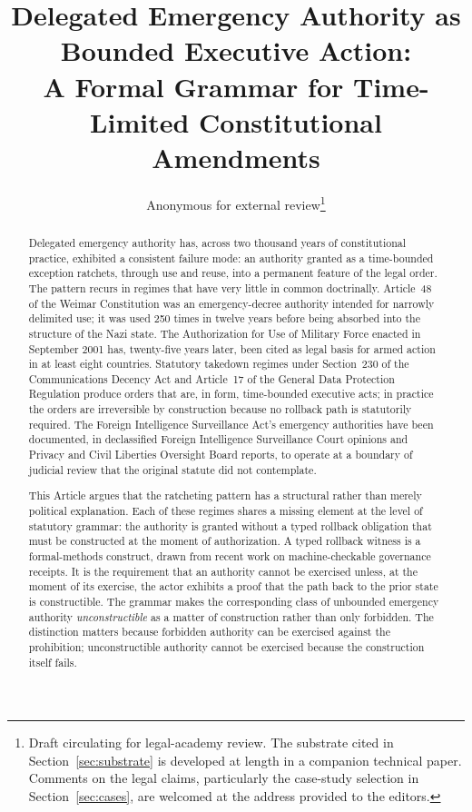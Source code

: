 \documentclass[11pt]{article}
\title{\large\bfseries Delegated Emergency Authority as Bounded Executive Action:\\
A Formal Grammar for Time-Limited Constitutional Amendments}
\author{Anonymous for external review\thanks{Draft circulating for legal-academy review.
The substrate cited in Section~\ref{sec:substrate} is developed at length in a companion technical paper.
Comments on the legal claims, particularly the case-study selection in Section~\ref{sec:cases},
are welcomed at the address provided to the editors.}}
\date{}
\begin{document}
\maketitle

\begin{abstract}
\noindent
Delegated emergency authority has, across two thousand years of constitutional practice,
exhibited a consistent failure mode: an authority granted as a time-bounded exception ratchets,
through use and reuse, into a permanent feature of the legal order.
The pattern recurs in regimes that have very little in common doctrinally.
Article~48 of the Weimar Constitution was an emergency-decree authority intended for narrowly delimited use;
it was used 250 times in twelve years before being absorbed into the structure of the Nazi state.
The Authorization for Use of Military Force enacted in September 2001 has, twenty-five years later,
been cited as legal basis for armed action in at least eight countries.
Statutory takedown regimes under Section~230 of the Communications Decency Act and Article~17 of the
General Data Protection Regulation produce orders that are, in form, time-bounded executive acts;
in practice the orders are irreversible by construction because no rollback path is statutorily required.
The Foreign Intelligence Surveillance Act's emergency authorities have been documented,
in declassified Foreign Intelligence Surveillance Court opinions and Privacy and Civil Liberties Oversight Board reports,
to operate at a boundary of judicial review that the original statute did not contemplate.

This Article argues that the ratcheting pattern has a structural rather than merely political explanation.
Each of these regimes shares a missing element at the level of statutory grammar:
the authority is granted without a typed rollback obligation that must be constructed
at the moment of authorization.
A typed rollback witness is a formal-methods construct, drawn from recent work on
machine-checkable governance receipts.
It is the requirement that an authority cannot be exercised unless,
at the moment of its exercise,
the actor exhibits a proof that the path back to the prior state is constructible.
The grammar makes the corresponding class of unbounded emergency authority \emph{unconstructible}
as a matter of construction rather than only forbidden.
The distinction matters because forbidden authority can be exercised against the prohibition;
unconstructible authority cannot be exercised because the construction itself fails.


\end{abstract}
\end{document}
